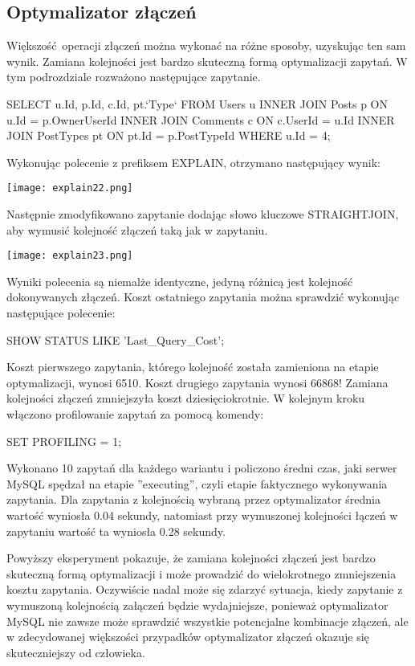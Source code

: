 \subsection{Optymalizator złączeń}
Większość operacji złączeń można wykonać na różne sposoby, uzyskując ten sam wynik. Zamiana kolejności jest bardzo skuteczną formą optymalizacji zapytań. W tym podrozdziale rozważono następujące zapytanie.
\newpage
\begin{spverbatim}
	SELECT u.Id, p.Id, c.Id, pt.`Type` FROM Users u INNER JOIN Posts p ON u.Id = p.OwnerUserId  INNER JOIN Comments c ON c.UserId = u.Id INNER JOIN 
	PostTypes pt ON pt.Id = p.PostTypeId WHERE u.Id = 4;
\end{spverbatim}
\bigskip
Wykonując polecenie z prefiksem EXPLAIN, otrzymano następujący wynik:
\begin{center}
	\texttt{[image: explain22.png]} 
\end{center}
Następnie zmodyfikowano zapytanie dodając słowo kluczowe STRAIGHT\textunderscore JOIN, aby wymusić kolejność złączeń taką jak w zapytaniu.
\begin{center}
	\texttt{[image: explain23.png]} 
\end{center}
Wyniki polecenia są niemalże identyczne, jedyną różnicą jest kolejność dokonywanych złączeń. Koszt ostatniego zapytania można sprawdzić wykonując następujące polecenie:
\begin{spverbatim}
	SHOW STATUS LIKE 'Last_Query_Cost';
\end{spverbatim}
Koszt pierwszego zapytania, którego kolejność została zamieniona na etapie optymalizacji, wynosi 6510. Koszt drugiego zapytania wynosi 66868! Zamiana kolejności złączeń zmniejszyła koszt dziesięciokrotnie.
W kolejnym kroku włączono profilowanie zapytań za pomocą komendy:
\begin{spverbatim}
	SET PROFILING = 1;
\end{spverbatim}
\bigskip
Wykonano 10 zapytań dla każdego wariantu i policzono średni czas, jaki serwer MySQL spędzał na etapie ''executing'', czyli etapie faktycznego wykonywania zapytania. Dla zapytania z kolejnością wybraną przez optymalizator średnia wartość wyniosła 0.04 sekundy, natomiast przy wymuszonej kolejności łączeń w zapytaniu wartość ta wyniosła 0.28 sekundy. 

Powyższy eksperyment pokazuje, że zamiana kolejności złączeń jest bardzo skuteczną formą optymalizacji i może prowadzić do wielokrotnego zmniejszenia kosztu zapytania. Oczywiście nadal może się zdarzyć sytuacja, kiedy zapytanie z wymuszoną kolejnością załączeń będzie wydajniejsze, ponieważ optymalizator MySQL nie zawsze może sprawdzić wszystkie potencjalne kombinacje złączeń, ale w zdecydowanej większości przypadków optymalizator złączeń okazuje się skuteczniejszy od człowieka.

